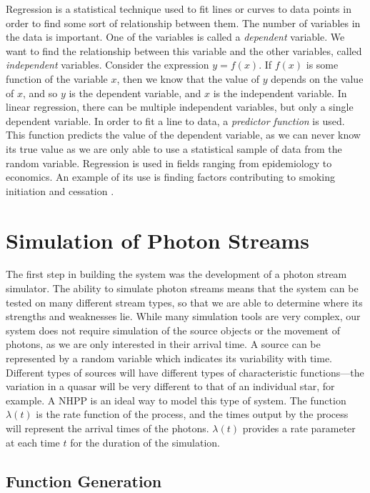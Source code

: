 \documentclass[a4paper,11pt,twoside]{article}
\begin{document}
   Regression is a statistical technique used to fit lines or curves to data
   points in order to find some sort of relationship between them. The number of
   variables in the data is important. One of the variables is called a
   \emph{dependent} variable. We want to find the relationship between this
   variable and the other variables, called \emph{independent}
   variables. Consider the expression $y=f(x)$. If $f(x)$ is some function of
   the variable $x$, then we know that the value of $y$ depends on the value of
   $x$, and so $y$ is the dependent variable, and $x$ is the independent
   variable. In linear regression, there can be multiple independent variables,
   but only a single dependent variable. In order to fit a line to data, a
   \emph{predictor function} is used. This function predicts the value of the
   dependent variable, as we can never know its true value as we are only able
   to use a statistical sample of data from the random variable. Regression is
   used in fields ranging from epidemiology to economics. An example of its use
   is finding factors contributing to smoking initiation and cessation
   \cite{van2005determinants}.
\section{Simulation of Photon Streams}
\label{sec-3}

  The first step in building the system was the development of a photon stream
  simulator. The ability to simulate photon streams means that the system can be
  tested on many different stream types, so that we are able to determine where
  its strengths and weaknesses lie. While many simulation tools are very
  complex, our system does not require simulation of the source objects or the
  movement of photons, as we are only interested in their arrival time. A source
  can be represented by a random variable which indicates its variability with
  time. Different types of sources will have different types of characteristic
  functions---the variation in a quasar will be very different to that of an
  individual star, for example. A NHPP is an ideal way to model this type of
  system. The function $\lambda(t)$ is the rate function of the process, and the
  times output by the process will represent the arrival times of the
  photons. $\lambda(t)$ provides a rate parameter at each time $t$ for the
  duration of the simulation.
\subsection{Function Generation}
\label{sec-3-1}
\end{document}

